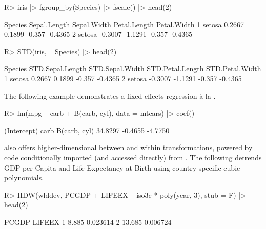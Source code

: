 \documentclass[nojss]{jss} %
\begin{document}
\begin{Schunk}
\begin{Sinput}
R> iris |> fgroup_by(Species) |> fscale() |> head(2)
\end{Sinput}
\begin{Soutput}
  Species Sepal.Length Sepal.Width Petal.Length Petal.Width
1  setosa       0.2667      0.1899       -0.357     -0.4365
2  setosa      -0.3007     -1.1291       -0.357     -0.4365
\end{Soutput}
\begin{Sinput}
R> STD(iris, ~ Species) |> head(2)
\end{Sinput}
\begin{Soutput}
  Species STD.Sepal.Length STD.Sepal.Width STD.Petal.Length STD.Petal.Width
1  setosa           0.2667          0.1899           -0.357         -0.4365
2  setosa          -0.3007         -1.1291           -0.357         -0.4365
\end{Soutput}
\end{Schunk}
The following example demonstrates a fixed-effects regression \`a la \citet{mundlak1978pooling}.
\begin{Schunk}
\begin{Sinput}
R> lm(mpg ~ carb + B(carb, cyl), data = mtcars) |> coef()
\end{Sinput}
\begin{Soutput}
 (Intercept)         carb B(carb, cyl) 
     34.8297      -0.4655      -4.7750 
\end{Soutput}
\end{Schunk}
 also offers higher-dimensional between and within transformations, powered by  code conditionally imported (and accessed directly) from . The following detrends GDP per Capita and Life Expectancy at Birth using country-specific cubic polynomials.
\begin{Schunk}
\begin{Sinput}
R> HDW(wlddev, PCGDP + LIFEEX ~ iso3c * poly(year, 3), stub = F) |> head(2)
\end{Sinput}
\begin{Soutput}
   PCGDP   LIFEEX
1  8.885 0.023614
2 13.685 0.006724
\end{Soutput}
\end{Schunk}
%
\end{document}
